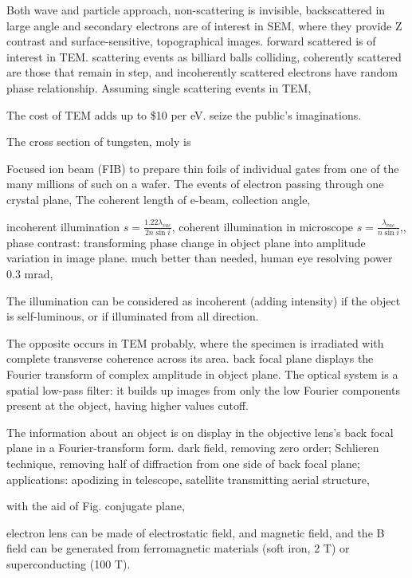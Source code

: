 Both wave and particle approach, non-scattering is invisible, backscattered in large angle and secondary electrons are of interest in SEM, where they provide Z contrast and surface-sensitive, topographical images. forward scattered is of interest in TEM.  scattering events as billiard balls colliding, coherently scattered are those that remain in step, and incoherently scattered electrons have random phase relationship. Assuming single scattering events in TEM, 

The cost of TEM adds up to \$10 per eV. seize the public's imaginations. 

The cross section of tungsten, moly is 

Focused ion beam (FIB) to prepare thin foils of individual gates from one of the many millions of such on a wafer. The events of electron passing through one crystal plane, The coherent length of e-beam, collection angle, 

\fi


\iffalse
incoherent illumination $s = \frac{1.22 \lambda_{vac}}{2n\sin i}$, 
coherent illumination in microscope $s = \frac{\lambda_{vac}}{n\sin i}$,, 
phase contrast: transforming phase change in object plane into amplitude variation in image plane. 
much better than needed, human eye resolving power 0.3 mrad, 

The illumination can be considered as incoherent (adding intensity) if the object is self-luminous, or if illuminated from all direction. 

The opposite occurs in TEM probably, where the specimen is irradiated with complete transverse coherence across its area. back 
focal plane displays the Fourier transform of complex amplitude in object plane. The optical system is a spatial low-pass filter: it builds up images from only the low Fourier components present at the object, having higher values cutoff. 

The information about an object is on display in the objective lens's back focal plane in a Fourier-transform form. dark field, removing zero order; Schlieren technique, removing half of diffraction from one side of back focal plane; applications: apodizing in telescope, satellite transmitting aerial structure, 

with the aid of Fig. 
conjugate plane, 

electron lens can be made of electrostatic field, and magnetic field, and the B field can be generated from ferromagnetic materials (soft iron, 2 T) or superconducting (100 T). 


